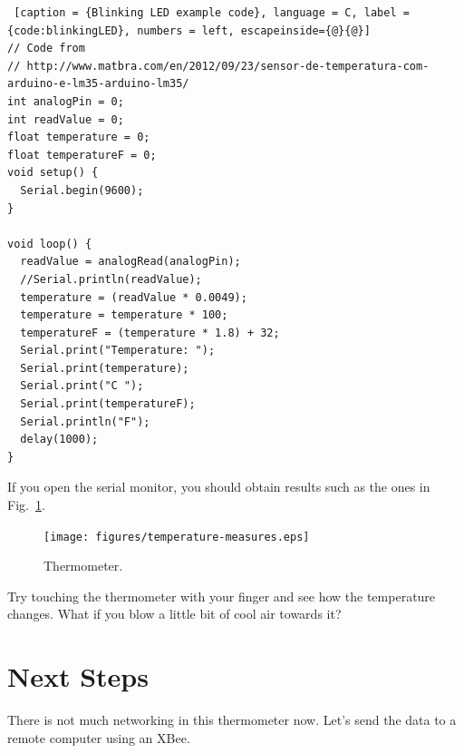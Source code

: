 \begin{lstlisting} [caption = {Blinking LED example code}, language = C, label = {code:blinkingLED}, numbers = left, escapeinside={@}{@}]
// Code from
// http://www.matbra.com/en/2012/09/23/sensor-de-temperatura-com-arduino-e-lm35-arduino-lm35/ 
int analogPin = 0; 
int readValue = 0; 
float temperature = 0; 
float temperatureF = 0;
void setup() { 
  Serial.begin(9600); 
}

void loop() { 
  readValue = analogRead(analogPin);
  //Serial.println(readValue);
  temperature = (readValue * 0.0049); 
  temperature = temperature * 100; 
  temperatureF = (temperature * 1.8) + 32;
  Serial.print("Temperature: "); 
  Serial.print(temperature); 
  Serial.print("C ");
  Serial.print(temperatureF);
  Serial.println("F");
  delay(1000); 
}
\end{lstlisting}

If you open the serial monitor, you should obtain results such as the ones in Fig.~\ref{fig:temperature-measures}.


\begin{figure}[htbp]
  \centering
  \texttt{[image: figures/temperature-measures.eps]}
  \caption{Thermometer.}
  \label{fig:temperature-measures}
\end{figure}

Try touching the thermometer with your finger and see how the temperature changes. What if you blow a little bit of cool air towards it?

\section{Next Steps}
There is not much networking in this thermometer now.
Let's send the data to a remote computer using an XBee.
